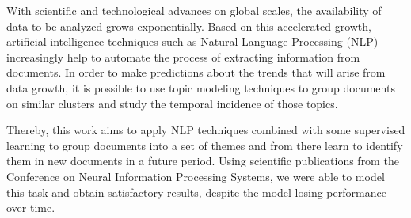 With scientific and technological advances on global scales, the availability of data to be analyzed grows exponentially. Based on this accelerated growth, artificial intelligence techniques such as Natural Language Processing (NLP) increasingly help to automate the process of extracting information from documents. In order to make predictions about the trends that will arise from data growth, it is possible to use topic modeling techniques to group documents on similar clusters and study the temporal incidence of those topics.

Thereby, this work aims to apply NLP techniques combined with some supervised learning to group documents into a set of themes and from there learn to identify them in new documents in a future period. Using scientific publications from the Conference on Neural Information Processing Systems, we were able to model this task and obtain satisfactory results, despite the model losing performance over time.
